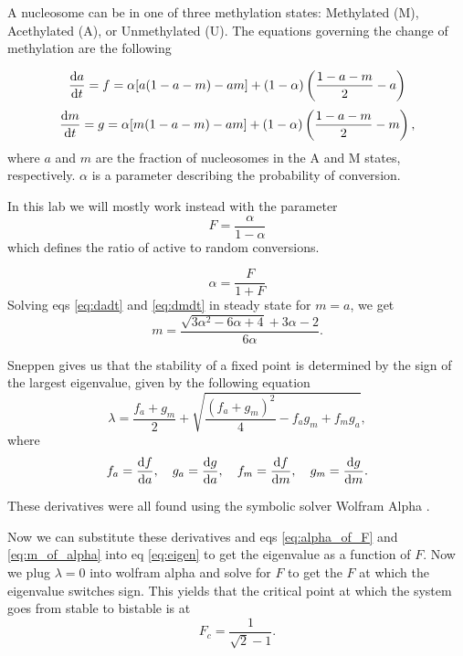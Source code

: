 \documentclass{article}
\begin{document}
A nucleosome can be in one of three methylation states: Methylated (M), Acethylated (A), or Unmethylated (U). 
The equations governing the change of methylation are the following

\begin{equation}
	\dv {a}{t} = f = \alpha[a(1-a-m) - am] + (1-\alpha )\left(\frac{1-a-m}{2}  - a\right)
	\label{eq:dadt}
\end{equation}
\begin{equation}
	\dv {m}{t} = g = \alpha[m(1-a-m) - am] + (1-\alpha )\left(\frac{1-a-m}{2}  - m\right),
	\label{eq:dmdt}
\end{equation}
where $a$ and $m$ are the fraction of nucleosomes in the A and M states, respectively. $\alpha$ is a parameter describing the probability of conversion.

In this lab we will mostly work instead with the parameter 
\begin{equation}
	F = \frac{\alpha}{1-\alpha}
	\label{eq:F}
\end{equation}
which defines the ratio of active to random conversions. 


\begin{equation}
	\alpha = \frac{F}{1 + F}
	\label{eq:alpha_of_F}
\end{equation}
Solving eqs \eqref{eq:dadt} and \eqref{eq:dmdt} in steady state for $m=a$, we get 
\begin{equation}
	m = \frac{\sqrt{3\alpha^2 - 6\alpha + 4} + 3\alpha - 2}{6\alpha}.
	\label{eq:m_of_alpha}
\end{equation}


Sneppen \cite{book} gives us that the stability of a fixed point is determined by the sign of the largest eigenvalue, given by the following equation
\begin{equation}
	\lambda = \frac{f_a + g_m}{2}  + \sqrt{\frac{\left(f_a + g_m\right)^2}{4} - f_ag_m + f_mg_a},
	\label{eq:eigen}
\end{equation}
where
\begin{equation}
	f_a = \dv{f}{a},\quad
	g_a = \dv{g}{a},\quad
	f_m = \dv{f}{m},\quad
	g_m = \dv{g}{m}.
\end{equation}

These derivatives were all found using the symbolic solver Wolfram Alpha \cite{wolfram}. 

Now we can substitute these derivatives and eqs \eqref{eq:alpha_of_F} and \eqref{eq:m_of_alpha} into eq \eqref{eq:eigen} to get the eigenvalue as a function of $F$. Now we plug $\lambda = 0$ into wolfram alpha \cite{wolfram} and solve for $F$ to get the $F$ at which the eigenvalue switches sign. This yields that the critical point at which the system goes from stable to bistable is at
\begin{equation}
	F_c = \frac{1}{\sqrt{2} - 1}.
\end{equation}
\end{document}
